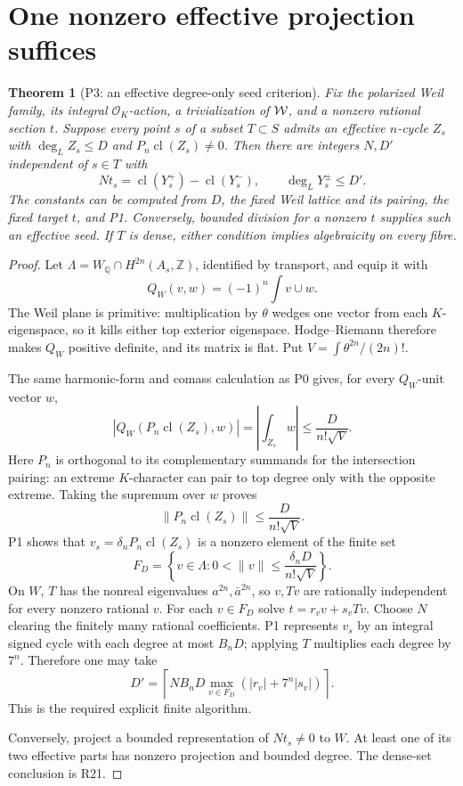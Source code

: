 \documentclass[11pt,a4paper]{article}
\newtheorem{theorem}{Theorem}[section]
\theoremstyle{definition}\newtheorem{definition}[theorem]{Definition}
\theoremstyle{remark}\newtheorem{remark}[theorem]{Remark}
\newcommand{\Q}{\mathbb Q}\newcommand{\Z}{\mathbb Z}\newcommand{\C}{\mathbb C}\newcommand{\R}{\mathbb R}
\newcommand{\cO}{\mathcal O}\newcommand{\CH}{\operatorname{CH}}\newcommand{\cl}{\operatorname{cl}}
\begin{document}
\section{One nonzero effective projection suffices}
\begin{theorem}[P3: an effective degree-only seed criterion]\label{P3}
Fix the polarized Weil family, its integral $\cO_K$-action, a trivialization of $\mathcal W$, and a nonzero rational section $t$. Suppose every point $s$ of a subset $T\subset S$ admits an effective $n$-cycle $Z_s$ with $\deg_LZ_s\le D$ and $P_n\cl(Z_s)\ne0$. Then there are integers $N,D'$ independent of $s\in T$ with
\[
 Nt_s=\cl(Y_s^+)-\cl(Y_s^-),\qquad \deg_LY_s^\pm\le D'.
\]
The constants can be computed from $D$, the fixed Weil lattice and its pairing, the fixed target $t$, and P1. Conversely, bounded division for a nonzero $t$ supplies such an effective seed. If $T$ is dense, either condition implies algebraicity on every fibre.
\end{theorem}
\begin{proof}
Let $\Lambda=W_\Q\cap H^{2n}(A_s,\Z)$, identified by transport, and equip it with
\[
 Q_W(v,w)=(-1)^n\int v\cup w.
\]
The Weil plane is primitive: multiplication by $\theta$ wedges one vector from each $K$-eigenspace, so it kills either top exterior eigenspace. Hodge--Riemann therefore makes $Q_W$ positive definite, and its matrix is flat. Put $V=\int\theta^{2n}/(2n)!$.

The same harmonic-form and comass calculation as P0 gives, for every $Q_W$-unit vector $w$,
\[
 |Q_W(P_n\cl(Z_s),w)|=\left|\int_{Z_s}w\right|
 \le \frac{D}{n!\sqrt V}.
\]
Here $P_n$ is orthogonal to its complementary summands for the intersection pairing: an extreme $K$-character can pair to top degree only with the opposite extreme. Taking the supremum over $w$ proves
\[
 \|P_n\cl(Z_s)\|\le\frac{D}{n!\sqrt V}.
\]
P1 shows that $v_s=\delta_nP_n\cl(Z_s)$ is a nonzero element of the finite set
\[
 F_D=\left\{v\in\Lambda:0<\|v\|\le\frac{\delta_nD}{n!\sqrt V}\right\}.
\]
On $W$, $T$ has the nonreal eigenvalues $a^{2n},\bar a^{2n}$, so $v,Tv$ are rationally independent for every nonzero rational $v$. For each $v\in F_D$ solve $t=r_vv+s_vTv$. Choose $N$ clearing the finitely many rational coefficients. P1 represents $v_s$ by an integral signed cycle with each degree at most $B_nD$; applying $T$ multiplies each degree by $7^n$. Therefore one may take
\begin{equation}\label{eq:seedD}
 D'=\left\lceil NB_nD\max_{v\in F_D}(|r_v|+7^n|s_v|)\right\rceil.
\end{equation}
This is the required explicit finite algorithm.

Conversely, project a bounded representation of $Nt_s\ne0$ to $W$. At least one of its two effective parts has nonzero projection and bounded degree. The dense-set conclusion is R21.
\end{proof}
\end{document}
